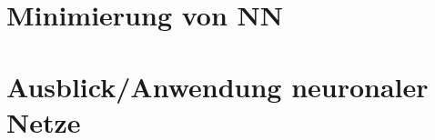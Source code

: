 \documentclass[fleqn,10pt]{SelfArx} %
\begin{document}
\section{Minimierung von NN}


\section{Ausblick/Anwendung neuronaler Netze}




\end{document}
